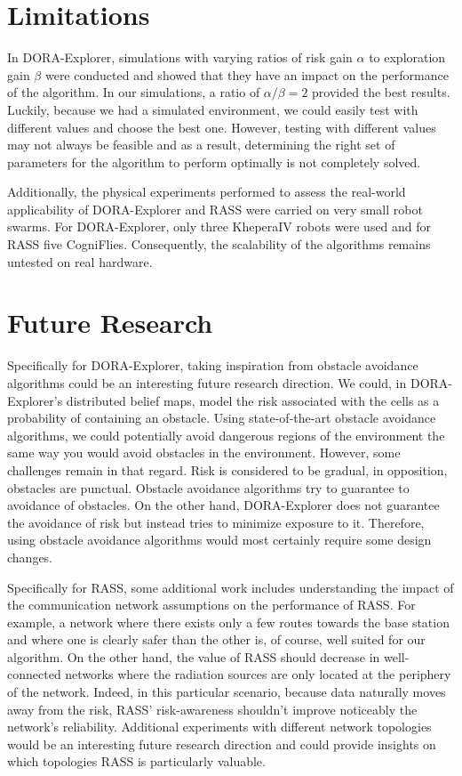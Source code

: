 \section{Limitations}\label{sec:Limitations}
In DORA-Explorer, simulations with varying ratios of risk gain $\alpha$ to exploration gain $\beta$ were conducted and showed that they have an impact on the performance of the algorithm. In our simulations, a ratio of $\alpha / \beta = 2$ provided the best results. Luckily, because we had a simulated environment, we could easily test with different values and choose the best one. However, testing with different values may not always be feasible and as a result, determining the right set of parameters for the algorithm to perform optimally is not completely solved.

Additionally, the physical experiments performed to assess the real-world applicability of DORA-Explorer and RASS were carried on very small robot swarms. For DORA-Explorer, only three KheperaIV robots were used and for RASS five CogniFlies. Consequently, the scalability of the algorithms remains untested on real hardware. 

\section{Future Research}

Specifically for DORA-Explorer, taking inspiration from obstacle avoidance algorithms could be an interesting future research direction. We could, in DORA-Explorer's distributed belief maps, model the risk associated with the cells as a probability of containing an obstacle. Using state-of-the-art obstacle avoidance algorithms, we could potentially avoid dangerous regions of the environment the same way you would avoid obstacles in the environment. However, some challenges remain in that regard. Risk is considered to be gradual, in opposition, obstacles are punctual. Obstacle avoidance algorithms try to guarantee to avoidance of obstacles. On the other hand, DORA-Explorer does not guarantee the avoidance of risk but instead tries to minimize exposure to it. Therefore, using obstacle avoidance algorithms would most certainly require some design changes.  

Specifically for RASS, some additional work includes understanding the impact of the communication network assumptions on the performance of RASS. For example, a network where there exists only a few routes towards the base station and where one is clearly safer than the other is, of course, well suited for our algorithm. On the other hand, the value of RASS should decrease in well-connected networks where the radiation sources are only located at the periphery of the network. Indeed, in this particular scenario, because data naturally moves away from the risk, RASS' risk-awareness shouldn't improve noticeably the network's reliability. Additional experiments with different network topologies would be an interesting future research direction and could provide insights on which topologies RASS is particularly valuable.

